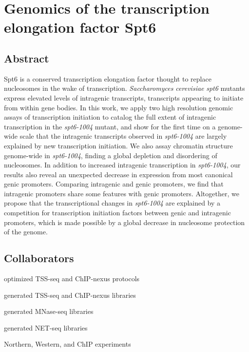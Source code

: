 \chapter{Genomics of the transcription elongation factor Spt6}
\label{chapter:six}

\section{Abstract}

Spt6 is a conserved transcription elongation factor thought to replace nucleosomes in the wake of transcription.
\textit{Saccharomyces cerevisiae} \textit{spt6} mutants express elevated levels of intragenic transcripts, transcripts appearing to initiate from within gene bodies.
In this work, we apply two high resolution genomic assays of transcription initiation to catalog the full extent of intragenic transcription in the \textit{spt6-1004} mutant, and show for the first time on a genome-wide scale that the intragenic transcripts observed in \textit{spt6-1004} are largely explained by new transcription initiation.
We also assay chromatin structure genome-wide in \textit{spt6-1004}, finding a global depletion and disordering of nucleosomes.
In addition to increased intragenic transcription in \textit{spt6-1004}, our results also reveal an unexpected decrease in expression from most canonical genic promoters.
Comparing intragenic and genic promoters, we find that intragenic promoters share some features with genic promoters.
Altogether, we propose that the transcriptional changes in \textit{spt6-1004} are explained by a competition for transcription initiation factors between genic and intragenic promoters, which is made possible by a global decrease in nucleosome protection of the genome.

\section{Collaborators}

\begin{description}[align=right, labelwidth=5cm, noitemsep]
    \item [Steve Doris] optimized TSS-seq and ChIP-nexus protocols
    \item [] generated TSS-seq and ChIP-nexus libraries
    \item [Olga Viktorovskaya] generated MNase-seq libraries
    \item [Magdalena Murawska] generated NET-seq libraries
    \item [Dan Spatt] Northern, Western, and ChIP experiments
\end{description}

